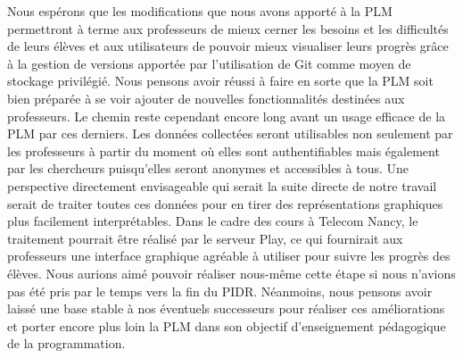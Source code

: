 \documentclass[12pt,a4paper]{article}
\begin{document}
Nous espérons que les modifications que nous avons apporté à la PLM permettront à terme aux professeurs de mieux cerner les besoins et les difficultés de leurs élèves et aux utilisateurs de pouvoir mieux visualiser leurs progrès grâce à la gestion de versions apportée par l'utilisation de Git comme moyen de stockage privilégié. Nous pensons avoir réussi à faire en sorte que la PLM soit bien préparée à se voir ajouter de nouvelles fonctionnalités destinées aux professeurs. Le chemin reste cependant encore long avant un usage efficace de la PLM par ces derniers. Les données collectées seront utilisables non seulement par les professeurs à partir du moment où elles sont authentifiables mais également par les chercheurs puisqu'elles seront anonymes et accessibles à tous. Une perspective directement envisageable qui serait la suite directe de notre travail serait de traiter toutes ces données pour en tirer des représentations graphiques plus facilement interprétables. Dans le cadre des cours à Telecom Nancy, le traitement pourrait être réalisé par le serveur Play, ce qui fournirait aux professeurs une interface graphique agréable à utiliser pour suivre les progrès des élèves. Nous aurions aimé pouvoir réaliser nous-même cette étape si nous n'avions pas été pris par le temps vers la fin du PIDR. Néanmoins, nous pensons avoir laissé une base stable à nos éventuels successeurs pour réaliser ces améliorations et porter encore plus loin la PLM dans son objectif d'enseignement pédagogique de la programmation.


%

\newpage

\begin{flushleft}
\printbibliography
\end{flushleft}

\listoffigures  %
\end{document}

